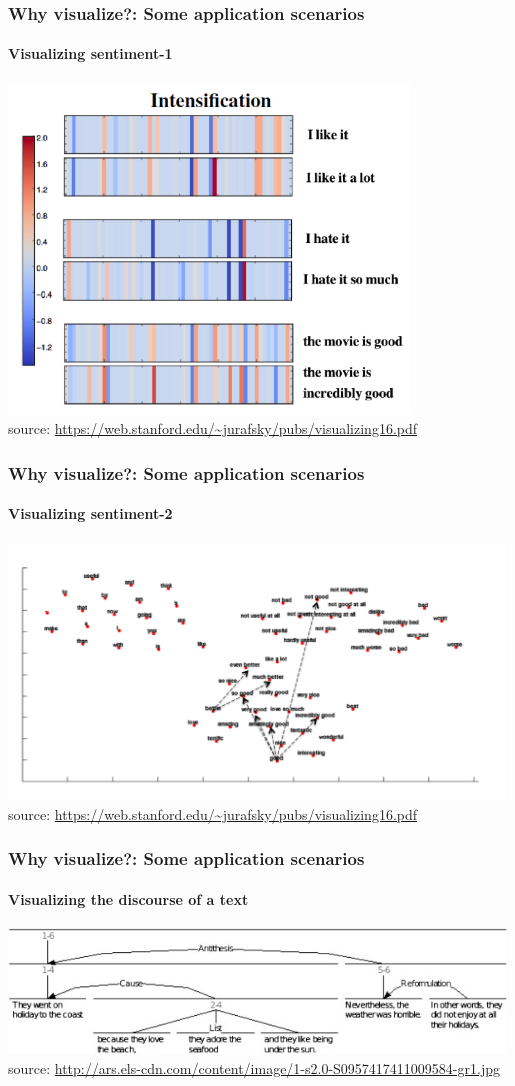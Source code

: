 \documentclass{beamer}
\begin{document}
\begin{frame}
\frametitle{Why visualize?: Some application scenarios}
\framesubtitle{Visualizing sentiment-1}
\includegraphics[width=0.8\textwidth]{nn-1.png} \\
\scriptsize source: \url{https://web.stanford.edu/~jurafsky/pubs/visualizing16.pdf} 
\end{frame}

\begin{frame}
\frametitle{Why visualize?: Some application scenarios}
\framesubtitle{Visualizing sentiment-2}
\includegraphics[width=0.99\textwidth]{nn-2.png} \\
\scriptsize source: \url{https://web.stanford.edu/~jurafsky/pubs/visualizing16.pdf} 
\end{frame}

\begin{frame}
\frametitle{Why visualize?: Some application scenarios}
\framesubtitle{Visualizing the discourse of a text}
\includegraphics[width=0.99\textwidth]{discoursevisualization.jpeg} \\
\scriptsize source: \url{http://ars.els-cdn.com/content/image/1-s2.0-S0957417411009584-gr1.jpg} 
\end{frame}
\end{document}
